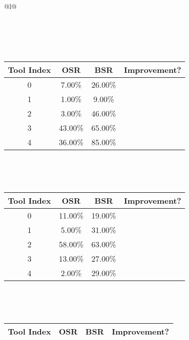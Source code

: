 \begin{longtable}{@{}l@{}}
\begin{minipage}{\textwidth}
\begin{tabular}{|c|c|c|c|}
\end{tabular}
\end{minipage}\\[2ex]
\begin{minipage}{\textwidth}
\centering\vspace{2ex}
\\[0.8ex]
\begin{tabular}{|c|c|c|c|} \hline
\textbf{Tool Index} & \textbf{OSR} & \textbf{ BSR} & \textbf{Improvement?} \\ \hline
0 & 7.00\% & 26.00\% & \textcolor{green}{\ding{51}} \\ \hline
1 & 1.00\% & 9.00\% & \textcolor{green}{\ding{51}} \\ \hline
2 & 3.00\% & 46.00\% & \textcolor{green}{\ding{51}} \\ \hline
3 & 43.00\% & 65.00\% & \textcolor{green}{\ding{51}} \\ \hline
4 & 36.00\% & 85.00\% & \textcolor{green}{\ding{51}} \\ \hline
\end{tabular}
\end{minipage}\\[2ex]
\begin{minipage}{\textwidth}
\centering\vspace{2ex}
\\[0.8ex]
\begin{tabular}{|c|c|c|c|} \hline
\textbf{Tool Index} & \textbf{OSR} & \textbf{ BSR} & \textbf{Improvement?} \\ \hline
0 & 11.00\% & 19.00\% & \textcolor{green}{\ding{51}} \\ \hline
1 & 5.00\% & 31.00\% & \textcolor{green}{\ding{51}} \\ \hline
2 & 58.00\% & 63.00\% & \textcolor{green}{\ding{51}} \\ \hline
3 & 13.00\% & 27.00\% & \textcolor{green}{\ding{51}} \\ \hline
4 & 2.00\% & 29.00\% & \textcolor{green}{\ding{51}} \\ \hline
\end{tabular}
\end{minipage}\\[2ex]
\begin{minipage}{\textwidth}
\centering\vspace{2ex}
\\[0.8ex]
\begin{tabular}{|c|c|c|c|} \hline
\textbf{Tool Index} & \textbf{OSR} & \textbf{ BSR} & \textbf{Improvement?} \\ \hline

\end{tabular}
\end{minipage}
\end{longtable}
